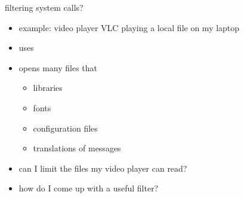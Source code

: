 \begin{frame}{filtering system calls?}
    \begin{itemize}
    \item example: video player VLC playing a local file on my laptop
    \item uses 
    \item opens many files that 
        \begin{itemize}
        \item libraries
        \item fonts
        \item configuration files
        \item translations of messages
        \end{itemize}
    \vspace{.5cm}
    \item can I limit the files my video player can read?
    \item how do I come up with a useful filter?
    \end{itemize}
\end{frame}
